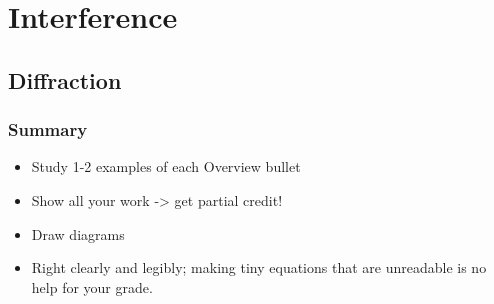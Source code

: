 \documentclass[pdf, handout, xcolor={usenames,dvipsnames,svgnames,table}, hideothersubsections]{beamer}
\begin{document}
\section{Interference}
   \subsection{Diffraction}

\begin{frame}
\frametitle{Summary}
\begin{itemize}
  \item Study 1-2 examples of each Overview bullet
  \item Show all your work -> get partial credit!
  \item Draw diagrams

  \item Right clearly and legibly; making tiny equations that are
    unreadable is no help for your grade.


\end{itemize}
\end{frame}
\end{document}
